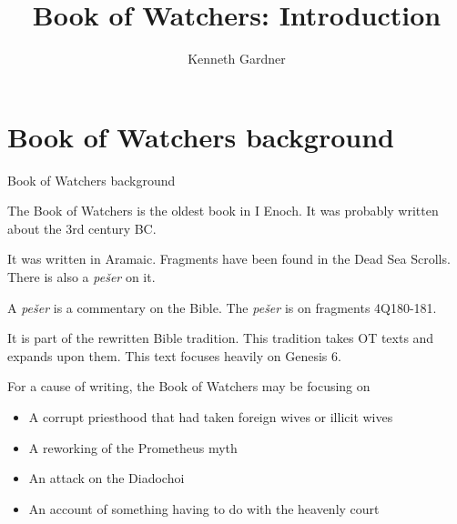 \documentclass{beamer}
\title{Book of Watchers: Introduction}
\author{Kenneth Gardner}
\begin{document}
\maketitle

\section{Book of Watchers background}

\begin{frame}
  \huge{Book of Watchers background}
\end{frame}

\begin{frame}
  The Book of Watchers is the oldest book in I Enoch.
  It was probably written about the 3rd century BC.
\end{frame}

\begin{frame}
  It was written in Aramaic.
  Fragments have been found in the Dead Sea Scrolls.
  There is also a \emph{pešer} on it.
\end{frame}

\begin{frame}
  A \emph{pešer} is a commentary on the Bible.
  The \emph{pešer} is on fragments 4Q180-181.
\end{frame}

\begin{frame}
  It is part of the rewritten Bible tradition.
  This tradition takes OT texts and expands upon them.
  This text focuses heavily on Genesis 6.
\end{frame}

\begin{frame}
  For a cause of writing, the Book of Watchers may be focusing on\pause
  \begin{itemize}
	\item A corrupt priesthood that had taken foreign wives or illicit wives\pause
	\item A reworking of the Prometheus myth\pause
	\item An attack on the Diadochoi\pause
	\item An account of something having to do with the heavenly court
  \end{itemize}
\end{frame}
\end{document}
